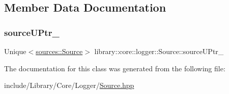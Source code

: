 \subsection{Member Data Documentation}
\mbox{\label{classlibrary_1_1core_1_1logger_1_1_source_a9461165d5d581171a044200b58007a3a}} 
\subsubsection{\texorpdfstring{source\+U\+Ptr\+\_\+}{sourceUPtr\_}}
{\footnotesize\ttfamily Unique$<$\hyperlink{classlibrary_1_1core_1_1logger_1_1sources_1_1_source}{sources\+::\+Source}$>$ library\+::core\+::logger\+::\+Source\+::source\+U\+Ptr\+\_\+}



The documentation for this class was generated from the following file\+:\begin{DoxyCompactItemize}
\item 
include/\+Library/\+Core/\+Logger/\hyperlink{_source_8hpp}{Source.\+hpp}\end{DoxyCompactItemize}

